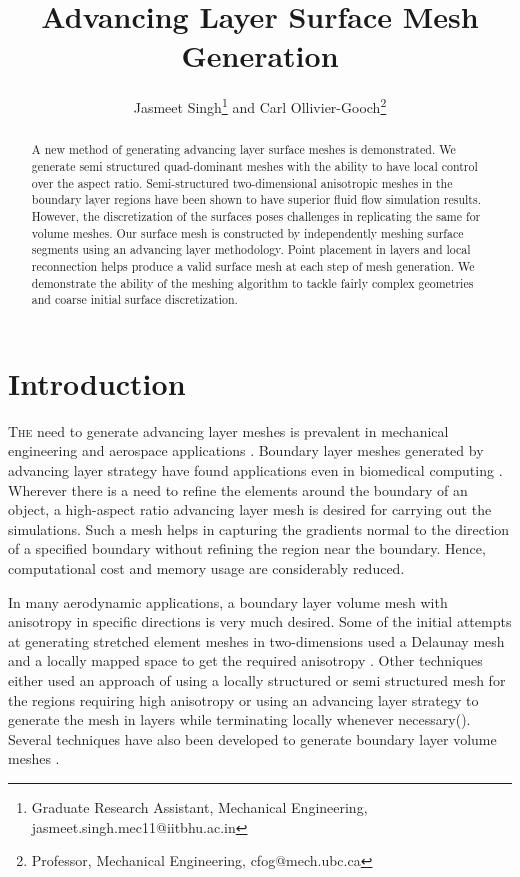 \documentclass[conf]{new-aiaa}
\title{Advancing Layer Surface Mesh Generation}
\author{Jasmeet Singh\footnote{Graduate Research Assistant, Mechanical Engineering, jasmeet.singh.mec11@iitbhu.ac.in} and Carl Ollivier-Gooch\footnote{Professor, Mechanical Engineering, cfog@mech.ubc.ca}}
\affil{University of British Columbia, Vancouver, British Columbia, V6T1Z4}
\begin{document}
\maketitle

\begin{abstract}
A new method of generating advancing layer surface meshes is demonstrated. We generate semi structured quad-dominant meshes with the ability to have local control over the aspect ratio. Semi-structured two-dimensional anisotropic meshes in the boundary layer regions have been shown to have superior fluid flow simulation results. However, the discretization of the surfaces poses challenges in replicating the same for volume meshes. Our surface mesh is constructed by independently meshing surface segments using an advancing layer methodology. Point placement in layers and local reconnection helps produce a valid surface mesh at each step of mesh generation. We demonstrate the ability of the meshing algorithm to tackle fairly complex geometries and coarse initial surface discretization.
\end{abstract}

\section{Introduction}
\lettrine{T}{he} need to generate advancing layer meshes is prevalent in mechanical engineering and aerospace applications \cite{sbardella2000semi}. Boundary layer meshes generated by advancing layer strategy have found applications even in biomedical computing \cite{dyedov2009variational}. Wherever there is a need to refine the elements around the boundary of an object, a high-aspect ratio advancing layer mesh is desired for carrying out the simulations. Such a mesh helps in capturing the gradients normal to the direction of a specified boundary without refining the region near the boundary. Hence, computational cost and memory usage are considerably reduced.%

In many aerodynamic applications, a boundary layer volume mesh with anisotropy in specific directions is very much desired. Some of the initial attempts at generating stretched element meshes in two-dimensions used a Delaunay mesh and a locally mapped space to get the required anisotropy \cite{mavriplis1990adaptive, castro1997anisotropic}. Other techniques either used an approach of using a locally structured or semi structured mesh for the regions requiring high anisotropy\cite{nakahashi1987fdm, kallinderis1996hybrid} or using an advancing layer strategy to generate the mesh in layers while terminating locally whenever necessary(\cite{pirzadeh1994unstructured, lohner1993matching, connell1995semistructured}). Several techniques have also been developed to generate boundary layer volume meshes \cite{garimella2000boundary, ito2002unstructured, sahni2008adaptive, ito2007multiple, aubry2009generation}.
\end{document}
